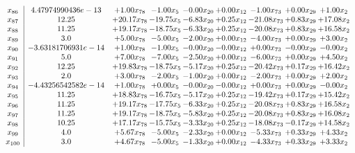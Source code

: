 \documentclass[8pt]{article}
\begin{document}
\[\begin{array}{c| c c@{\hskip 2pt} c@{\hskip 2pt} c@{\hskip 2pt} c@{\hskip 2pt} c@{\hskip 2pt} c@{\hskip 2pt} c@{\hskip 2pt} }
 x_{86}   &  4.47974990436e-13 & +  1.00 x_{78} & -1.00 x_{5} & -0.00 x_{20} & +  0.00 x_{12} & -1.00 x_{73} & +  0.00 x_{29} & +  1.00 x_{2}\\
 x_{87}   &  12.25 & + 20.17 x_{78} & -19.75 x_{5} & -6.83 x_{20} & +  0.25 x_{12} & -21.08 x_{73} & +  0.83 x_{29} & + 17.08 x_{2}\\
 x_{88}   &  11.25 & + 19.17 x_{78} & -18.75 x_{5} & -6.33 x_{20} & +  0.25 x_{12} & -20.08 x_{73} & +  0.83 x_{29} & + 16.58 x_{2}\\
 x_{89}   &  3.0 & +  5.00 x_{78} & -5.00 x_{5} & -2.00 x_{20} & +  0.00 x_{12} & -4.00 x_{73} & +  0.00 x_{29} & +  3.00 x_{2}\\
 x_{90}   &  -3.63181706931e-14 & +  1.00 x_{78} & -1.00 x_{5} & -0.00 x_{20} & -0.00 x_{12} & +  0.00 x_{73} & -0.00 x_{29} & -0.00 x_{2}\\
 x_{91}   &  5.0 & +  7.00 x_{78} & -7.00 x_{5} & -2.50 x_{20} & +  0.00 x_{12} & -6.00 x_{73} & +  0.00 x_{29} & +  4.50 x_{2}\\
 x_{92}   &  12.25 & + 19.83 x_{78} & -18.75 x_{5} & -5.17 x_{20} & +  0.25 x_{12} & -20.42 x_{73} & +  0.17 x_{29} & + 16.42 x_{2}\\
 x_{93}   &  2.0 & +  3.00 x_{78} & -2.00 x_{5} & -1.00 x_{20} & +  0.00 x_{12} & -2.00 x_{73} & +  0.00 x_{29} & +  2.00 x_{2}\\
 x_{94}   &  -4.43256542582e-14 & +  1.00 x_{78} & +  0.00 x_{5} & -0.00 x_{20} & -0.00 x_{12} & +  0.00 x_{73} & +  0.00 x_{29} & -0.00 x_{2}\\
 x_{95}   &  11.25 & + 18.83 x_{78} & -16.75 x_{5} & -5.17 x_{20} & +  0.25 x_{12} & -19.42 x_{73} & +  0.17 x_{29} & + 15.42 x_{2}\\
 x_{96}   &  11.25 & + 19.17 x_{78} & -17.75 x_{5} & -6.33 x_{20} & +  0.25 x_{12} & -20.08 x_{73} & +  0.83 x_{29} & + 16.58 x_{2}\\
 x_{97}   &  11.25 & + 19.17 x_{78} & -18.75 x_{5} & -5.83 x_{20} & +  0.25 x_{12} & -20.08 x_{73} & +  0.83 x_{29} & + 16.08 x_{2}\\
 x_{98}   &  10.25 & + 17.17 x_{78} & -15.75 x_{5} & -3.33 x_{20} & +  0.25 x_{12} & -18.08 x_{73} & -0.17 x_{29} & + 14.58 x_{2}\\
 x_{99}   &  4.0 & +  5.67 x_{78} & -5.00 x_{5} & -2.33 x_{20} & +  0.00 x_{12} & -5.33 x_{73} & +  0.33 x_{29} & +  4.33 x_{2}\\
 x_{100}   &  3.0 & +  4.67 x_{78} & -5.00 x_{5} & -1.33 x_{20} & +  0.00 x_{12} & -4.33 x_{73} & +  0.33 x_{29} & +  3.33 x_{2}\\

\end{array}\]
\end{document}
